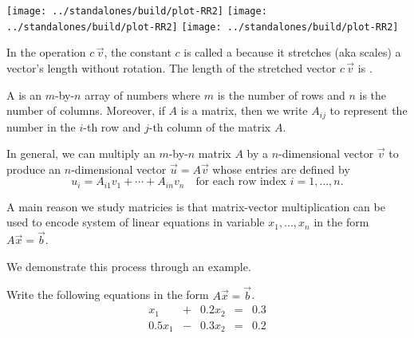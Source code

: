 \documentclass[../main.tex]{subfiles}
\begin{document}
\begin{itemize}[wide]
    \texttt{[image: ../standalones/build/plot-RR2]}
    \quad
    \texttt{[image: ../standalones/build/plot-RR2]}
    \quad
    \texttt{[image: ../standalones/build/plot-RR2]}

    \faStar{} In the operation \(c \, \vec{v}\), the constant \(c\) is called a  because it stretches (aka scales) a vector's length without rotation.  The length of the stretched vector \(c \, \vec{v}\) is \underline{\hspace{2in}\phantom{\huge X}}.

\end{itemize}
\clearpage

A  is an \(m\)-by-\(n\) array of numbers where \(m\) is the number of rows and \(n\) is the number of columns.  Moreover, if \(A\) is a matrix, then we write \(A_{ij}\) to represent the number in the \(i\)-th row and \(j\)-th column of the matrix \(A\). 

In general, we can multiply an \(m\)-by-\(n\) matrix \(A\) by a \(n\)-dimensional vector \(\vec{v}\) to produce an \(n\)-dimensional vector \(\vec{u} = A\vec{v}\) whose entries are defined by
\[
  u_{i} = A_{i1} v_{1} + \cdots + A_{in} v_{n} 
  \quad\text{for each row index \(i = 1, \ldots, n\)}.
\]

\faStar{} A main reason we study matricies is that matrix-vector multiplication can be used to encode system of linear equations in variable \(x_{1}, \ldots, x_{n}\) in the form \(A \vec{x} = \vec{b}\). 

We demonstrate this process through an example.

\begin{example}
  Write the following equations in the form \(A \vec{x} = \vec{b}\).
  \[
    \begin{array}{rcrcr}
      x_{1} &+& 0.2 x_{2} &=& 0.3 \\
      0.5 x_{1} &-& 0.3 x_{2} &=& 0.2
    \end{array}
  \]
\end{example}
\end{document}

